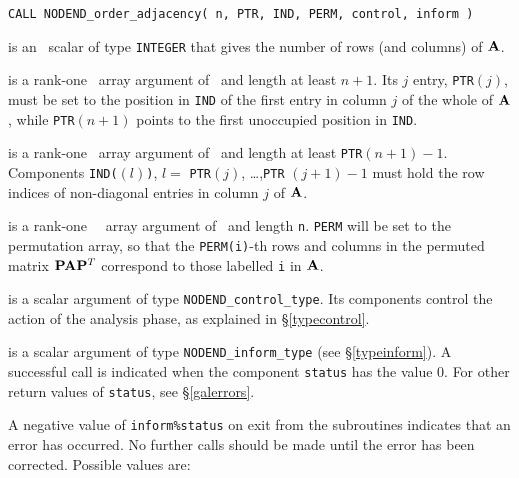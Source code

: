 \documentclass{galahad}
\newcommand{\packagename}{NODEND}
\begin{document}
\hskip0.5in
{\tt CALL \packagename\_order\_adjacency( n, PTR, IND, PERM, control, inform )}
\begin{description}
 is an \intentin\ scalar of type  {\tt INTEGER} that gives the
number of rows (and columns) of ${\mathbf{A}}$.

 is a rank-one \integer\ array argument of \intentin\ and length 
 at least $n+1$. Its $j$ entry, {\tt PTR}$(j)$, must be set to the position
 in {\tt IND} of the first entry in column $j$ of the whole of ${\mathbf{A}}$,
 while {\tt PTR}$(n+1)$ points to the first unoccupied position in {\tt IND}.

 is a rank-one \integer\ array argument of \intentin\ and length 
 at least  {\tt PTR}$(n+1)-1$. Components
 {\tt IND(}$(l)${\tt )}, $l =$ {\tt PTR}$(j)$, \ldots ,{\tt PTR} $(j+1)-1$
 must hold the row indices of non-diagonal entries in column $j$ of ${\mathbf{A}}$.

 is a rank-one \integer\ \intentout\ array argument
 of \intentout\ and length {\tt n}.
 {\tt PERM} will be set to the permutation array, so that the 
 {\tt PERM(i)}-th rows and columns in the permuted matrix 
 ${\mathbf{P}} {\mathbf{A}} {\mathbf{P}}^T$ correspond to those labelled {\tt i} in ${\mathbf{A}}$.

 is a scalar \intentout argument of type
{\tt \packagename\_control\_type}. Its components control the action
of the analysis phase, as explained in
\S\ref{typecontrol}.

 is a scalar \intentout argument of type
{\tt \packagename\_inform\_type}
(see \S\ref{typeinform}).
A successful call is indicated when the  component {\tt status} has the value 0.
For other return values of {\tt status}, see \S\ref{galerrors}.
\end{description}


\galerrors
A negative value of {\tt inform\%status} on exit from the subroutines
indicates that an error has occurred. No further calls should be made
until the error has been corrected. Possible values are:
\end{document}
